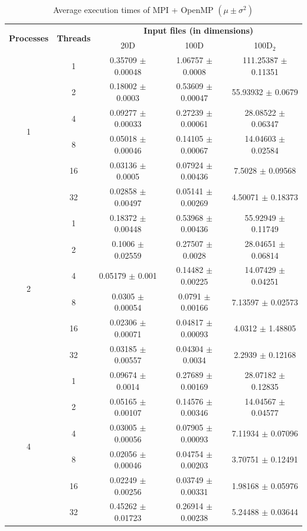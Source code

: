 \documentclass[11pt, journal]{IEEEtran}
\begin{document}
\begin{table}
    \renewcommand{\arraystretch}{1.3}
    \caption{Average execution times of MPI + OpenMP $\left(\mu \pm \sigma^2\right)$}
    \label{mpi_omp_exec}
    \centering
    \begin{tabular}{|c|c||c|c|c|}
    \hline
    \multirow{2}{*}{\textbf{Processes}} & \multirow{2}{*}{\textbf{Threads}} & \multicolumn{3}{c|}{\textbf{Input files (in dimensions)}} \\\cline{3-5}
     & & 20D & 100D & 100D$_2$ \\
    \hline\hline
    \multirow{6}{*}{1} & 1 & 0.35709 $\pm$ 0.00048 & 1.06757 $\pm$ 0.0008 & 111.25387 $\pm$ 0.11351 \\
    \cline{2-5}
     & 2 & 0.18002 $\pm$ 0.0003 & 0.53609 $\pm$ 0.00047 & 55.93932 $\pm$ 0.0679 \\
    \cline{2-5}
     & 4 & 0.09277 $\pm$ 0.00033 & 0.27239 $\pm$ 0.00061 & 28.08522 $\pm$ 0.06347 \\
    \cline{2-5}
     & 8 & 0.05018 $\pm$ 0.00046 & 0.14105 $\pm$ 0.00067 & 14.04603 $\pm$ 0.02584 \\
    \cline{2-5}
     & 16 & 0.03136 $\pm$ 0.0005 & 0.07924 $\pm$ 0.00436 & 7.5028 $\pm$ 0.09568 \\
    \cline{2-5}
     & 32 & 0.02858 $\pm$ 0.00497 & 0.05141 $\pm$ 0.00269 & 4.50071 $\pm$ 0.18373 \\
    \hline\hline
    \multirow{6}{*}{2} & 1 & 0.18372 $\pm$ 0.00448 & 0.53968 $\pm$ 0.00436 & 55.92949 $\pm$ 0.11749 \\
    \cline{2-5} 
     & 2 & 0.1006 $\pm$ 0.02559 & 0.27507 $\pm$ 0.0028 & 28.04651 $\pm$ 0.06814 \\
    \cline{2-5} 
     & 4 & 0.05179 $\pm$ 0.001 & 0.14482 $\pm$ 0.00225 & 14.07429 $\pm$ 0.04251 \\
    \cline{2-5} 
     & 8 & 0.0305 $\pm$ 0.00054 & 0.0791 $\pm$ 0.00166 & 7.13597 $\pm$ 0.02573 \\
    \cline{2-5} 
     & 16 & 0.02306 $\pm$ 0.00071 & 0.04817 $\pm$ 0.00093 & 4.0312 $\pm$ 1.48805 \\
    \cline{2-5} 
     & 32 & 0.03185 $\pm$ 0.00557 & 0.04304 $\pm$ 0.0034 & 2.2939 $\pm$ 0.12168 \\
    \hline\hline
    \multirow{6}{*}{4} & 1 & 0.09674 $\pm$ 0.0014 & 0.27689 $\pm$ 0.00169 & 28.07182 $\pm$ 0.12835 \\
    \cline{2-5} 
     & 2 & 0.05165 $\pm$ 0.00107 & 0.14576 $\pm$ 0.00346 & 14.04567 $\pm$ 0.04577 \\
    \cline{2-5} 
     & 4 & 0.03005 $\pm$ 0.00056 & 0.07905 $\pm$ 0.00093 & 7.11934 $\pm$ 0.07096 \\
    \cline{2-5} 
     & 8 & 0.02056 $\pm$ 0.00046 & 0.04754 $\pm$ 0.00203 & 3.70751 $\pm$ 0.12491 \\
    \cline{2-5} 
     & 16 & 0.02249 $\pm$ 0.00256 & 0.03749 $\pm$ 0.00331 & 1.98168 $\pm$ 0.05976 \\
    \cline{2-5} 
     & 32 & 0.45262 $\pm$ 0.01723 & 0.26914 $\pm$ 0.00238 & 5.24488 $\pm$ 0.03644 \\
    \hline
    \end{tabular}
\end{table}
\end{document}
